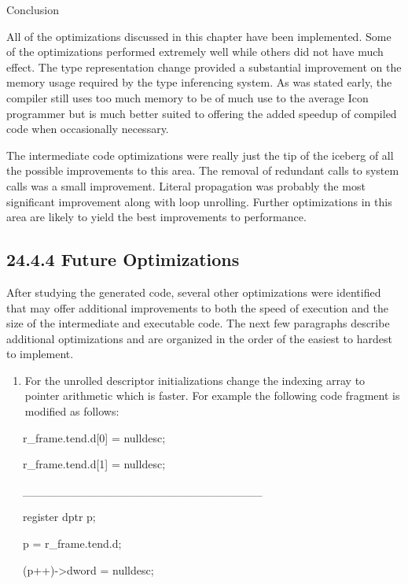 {\sffamily
Conclusion}

All of the optimizations discussed in this chapter have been
implemented. Some of the optimizations performed extremely well while
others did not have much effect. The type representation change
provided a substantial improvement on the memory usage required by the
type inferencing system. As was stated early, the compiler still uses
too much memory to be of much use to the average Icon programmer but
is much better suited to offering the added speedup of compiled code
when occasionally necessary.

The intermediate code optimizations were really just the tip of the
iceberg of all the possible improvements to this area. The removal of
redundant calls to system calls was a small improvement. Literal
propagation was probably the most significant improvement along with
loop unrolling. Further optimizations in this area are likely to yield
the best improvements to performance.

\subsection[24.4.4 Future Optimizations]{24.4.4 Future Optimizations}

After studying the generated code, several other optimizations were
identified that may offer additional improvements to both the speed of
execution and the size of the intermediate and executable code. The
next few paragraphs describe additional optimizations and are
organized in the order of the easiest to hardest to implement.

\liststyleLxxxvi
\begin{enumerate}
\item 
For the unrolled descriptor initializations change the indexing array to pointer arithmetic which is faster. For example
the following code fragment is modified as follows: 
\end{enumerate}
{\ttfamily\mdseries
\ \ \ r\_frame.tend.d[0] = nulldesc;}

{\ttfamily\mdseries
\ \ \ r\_frame.tend.d[1] = nulldesc;}

{\ttfamily\mdseries
\ \ \ \_\_\_\_\_\_\_\_\_\_\_\_\_\_\_\_\_\_\_\_\_\_\_\_\_\_\_\_\_}


\bigskip

{\ttfamily\mdseries
\ \ \ register dptr p;}

{\ttfamily\mdseries
\ \ \ p = r\_frame.tend.d;}

{\ttfamily\mdseries
\ \ \ (p++)-{\textgreater}dword = nulldesc;}

